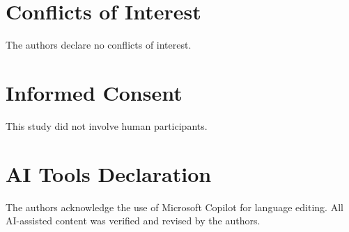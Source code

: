\documentclass[12pt]{article}
\theoremstyle{thmstyleone}%
\theoremstyle{thmstyletwo}%
\theoremstyle{thmstylethree}%
\begin{document}


\section*{Conflicts of Interest}
The authors declare no conflicts of interest.

\section*{Informed Consent}  
This study did not involve human participants.

\section*{AI Tools Declaration}
The authors acknowledge the use of Microsoft Copilot for language editing. All AI-assisted content was verified and revised by the authors.





\end{document}

